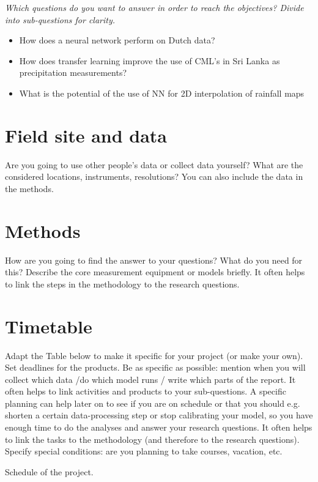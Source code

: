 \documentclass[twocolumn, 10pt, a4paper]{article}
\begin{document}
	\textit{Which questions do you want to answer in order to reach the objectives? Divide into sub-questions for clarity.}
	\begin{itemize}
		\item How does a neural network perform on Dutch data?
		\item How does transfer learning improve the use of CML's in Sri Lanka as precipitation measurements?
		\item What is the potential of the use of NN for 2D interpolation of rainfall maps
	\end{itemize}
	
	
	\section{Field site and data}
	
	Are you going to use other people's data or collect data yourself? What are the considered locations, instruments, resolutions? You can also include the data in the methods.
	
	\section{Methods}
	
	How are you going to find the answer to your questions? What do you need for this? Describe the core measurement equipment or models briefly. It often helps to link the steps in the methodology to the research questions.
	
	
	\section{Timetable}
	
	Adapt the Table below to make it specific for your project (or make your own). Set deadlines for the products. Be as specific as possible: mention when you will collect which data /do which model runs / write which parts of the report. It often helps to link activities and products to your sub-questions. A specific planning can help later on to see if you are on schedule or that you should e.g. shorten a certain data-processing step or stop calibrating your model, so you have enough time to do the analyses and answer your research questions. It often helps to link the tasks to the methodology (and therefore to the research questions). Specify special conditions: are you planning to take courses, vacation, etc. 
	
	
	\begin{table*}[t]
		\caption{Schedule of the project.}
		\label{tab:schedule}
	\end{table*}
	
\end{document}
